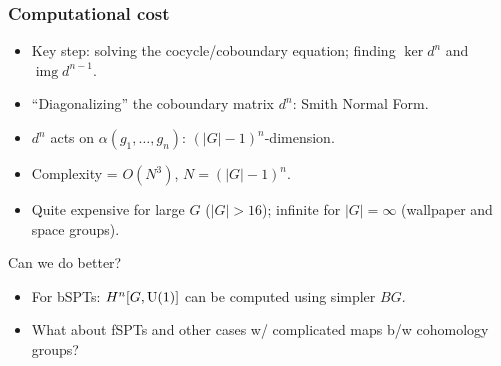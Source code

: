\documentclass[xcolor=table, aspectratio=43,ignorenonframetext]{beamer}
\DeclareMathOperator{\img}{img}
\newcommand{\uone}{\text U(1)}
\begin{document}
\begin{frame}
	\frametitle{Computational cost}
	\begin{itemize}
		\item Key step: solving the cocycle/coboundary equation; finding $\ker d^n$ and $\img d^{n-1}$.
		\item ``Diagonalizing'' the coboundary matrix $d^n$: Smith Normal Form.
		\item $d^n$ acts on $\alpha(g_1,\ldots,g_n)$: $(|G|-1)^n$-dimension.
		\item Complexity = $O(N^3)$, $N = (|G|-1)^n$.
		\item Quite expensive for large $G$ ($|G| > 16$); infinite for $|G|=\infty$ (wallpaper and space groups).
	\end{itemize}
	\begin{block}{Can we do better?}
		\begin{itemize}
			\item For bSPTs: $H^n[G,\uone]$ can be computed using simpler $BG$.
			\item What about fSPTs and other cases w/ complicated maps b/w cohomology groups?
		\end{itemize}
	\end{block}
\end{frame}
\end{document}
